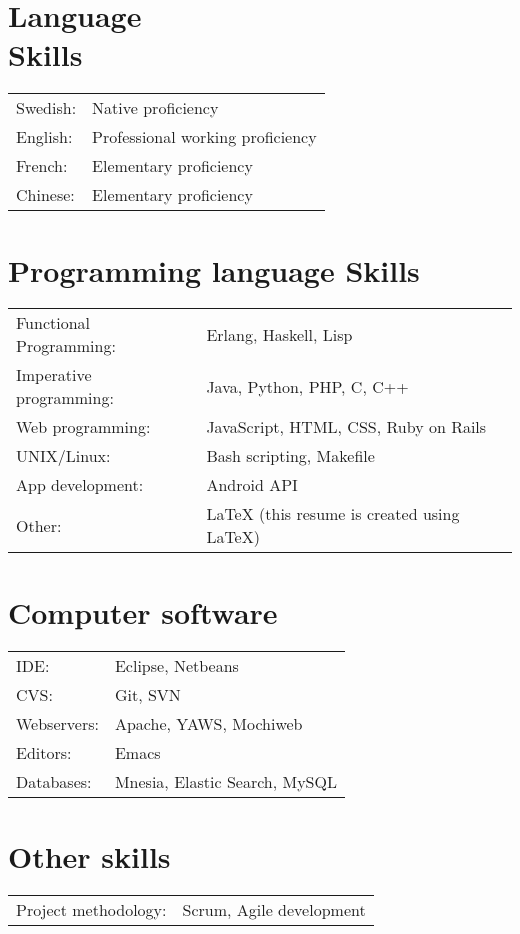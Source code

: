 \documentclass[margin]{res}
\begin{document}
\begin{resume}
\section{Language \\ Skills}
   \begin{tabular}{l p{3in}}
    Swedish: & Native proficiency \\
    English: & Professional working proficiency \\
    French:  & Elementary proficiency \\
    Chinese:  & Elementary proficiency
 \end{tabular}

\section{Programming language Skills}
   \begin{tabular}{l p{3in}}
    Functional Programming: & Erlang, Haskell, Lisp \\
    Imperative programming: & Java, Python, PHP, C, C++ \\
    Web programming: & JavaScript, HTML, CSS, Ruby on Rails \\
    UNIX/Linux: & Bash scripting, Makefile \\
    App development: & Android API \\
    Other: & LaTeX (this resume is created using LaTeX)
 \end{tabular}

\section{Computer software}
\begin{tabular}{l p{3in}}
  IDE: & Eclipse, Netbeans \\
  CVS: & Git, SVN \\
  Webservers: & Apache, YAWS, Mochiweb \\
  Editors: & Emacs \\
  Databases: & Mnesia, Elastic Search, MySQL
\end{tabular}

\section{Other skills}
\begin{tabular}{l p{3in}}
  Project methodology: & Scrum, Agile development
\end{tabular}


\end{resume}
\end{document}
